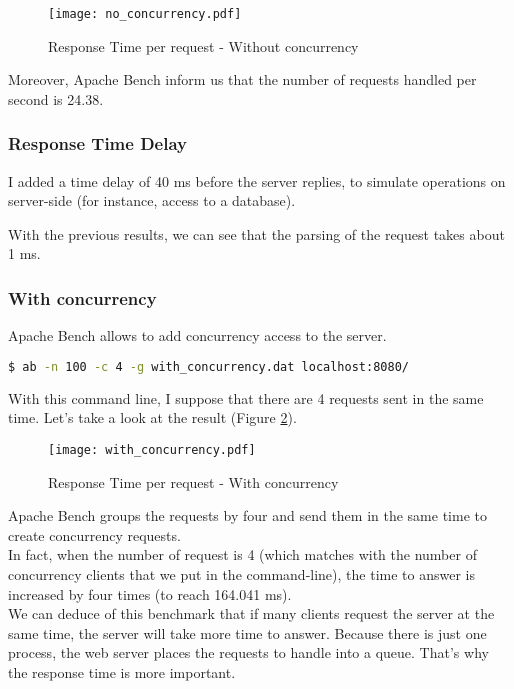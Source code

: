 \documentclass[a4paper, 11pt]{article}
\begin{document}
\begin{figure}
\texttt{[image: no\_concurrency.pdf]}
\centering
\caption{Response Time per request - Without concurrency}
\label{no_concurrency}
\end{figure}

Moreover, Apache Bench inform us that the number of requests handled per second is 24.38.

\subsubsection{Response Time Delay}

I added a time delay of 40 ms before the server replies, to simulate operations on server-side (for instance, access to a database).

With the previous results, we can see that the parsing of the request takes about 1 ms.

\subsubsection{With concurrency}
Apache Bench allows to add concurrency access to the server.
\begin{lstlisting}[language=Bash]
$ ab -n 100 -c 4 -g with_concurrency.dat localhost:8080/
\end{lstlisting} 
With this command line, I suppose that there are 4 requests sent in the same time. Let's take a look at the result (Figure \ref{with_concurrency}).

\begin{figure}
\texttt{[image: with\_concurrency.pdf]}
\centering
\caption{Response Time per request - With concurrency}
\label{with_concurrency}
\end{figure}

Apache Bench groups the requests by four and send them in the same time to create concurrency requests.\\

In fact, when the number of request is 4 (which matches with the number of concurrency clients that we put in the command-line), the time to answer is increased by four times (to reach 164.041 ms).\\

We can deduce of this benchmark that if many clients request the server at the same time, the server will take more time to answer. Because there is just one process, the web server places the requests to handle into a queue. That's why the response time is more important.
\end{document}
